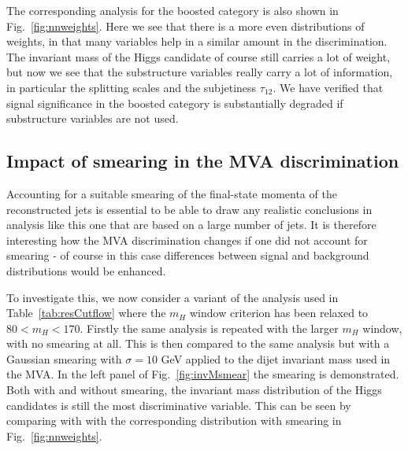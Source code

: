 The corresponding analysis for the boosted category is also
shown in Fig.~\ref{fig:nnweights}.
%
Here we see that there is a more even distributions of weights, in that many
variables help in a similar amount in the discrimination.
%
The invariant mass of the Higgs candidate of course still carries a lot of weight,
but now we see that the substructure variables really carry  a lot of information,
in particular the splitting scales and the subjetiness $\tau_{12}$.
%
We have verified that signal significance in the boosted category is substantially
degraded if substructure variables are not used.






\subsection{Impact of smearing in the MVA discrimination}

Accounting for a suitable smearing of the final-state momenta of the reconstructed
jets is essential to be able to draw any realistic conclusions in analysis like
this one that are based on a large number of jets.
%
It is therefore interesting how the MVA discrimination changes if one did not account
for smearing - of course in this case differences between signal and background distributions
would be enhanced.

To investigate this, we now consider a variant of the analysis used in
Table~\ref{tab:resCutflow} where the $m_H$ window criterion has been relaxed to $80 < m_H < 170$.
%
Firstly the same analysis is repeated with the larger $m_H$ window, with no smearing at all.
%
This is then compared to the same analysis but with a Gaussian smearing with $\sigma=10$ GeV applied to the dijet invariant mass used in the MVA.
%
In the left panel of Fig.~\ref{fig:invMsmear} the smearing is demonstrated.
%
Both with and without smearing, the  invariant mass distribution of the
Higgs candidates is still the most discriminative variable.
%
This can be seen by comparing with   with the corresponding distribution with smearing in
  Fig.~\ref{fig:nnweights}.




